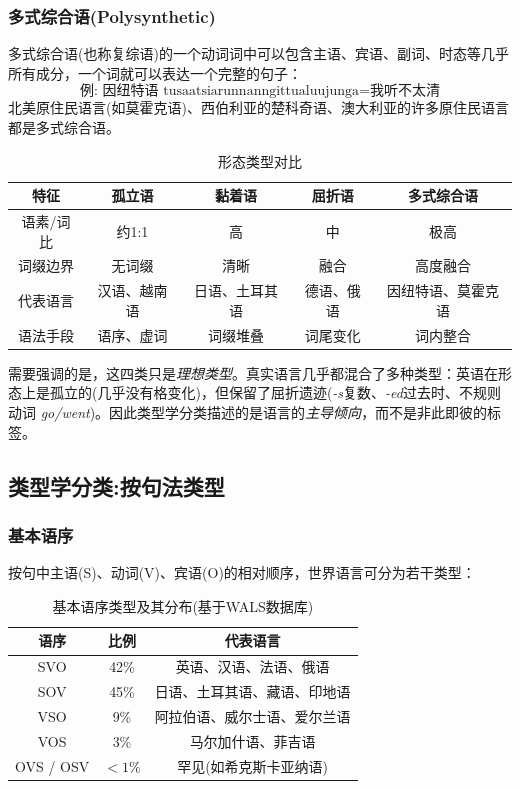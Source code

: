 \subsubsection{多式综合语(Polysynthetic)}

多式综合语(也称复综语)的一个动词词中可以包含主语、宾语、副词、时态等几乎所有成分，一个词就可以表达一个完整的句子：
\begin{equation}
    \text{例: 因纽特语 tusaatsiarunnanngittualuujunga} = \text{我听不太清}
\end{equation}
北美原住民语言(如莫霍克语)、西伯利亚的楚科奇语、澳大利亚的许多原住民语言都是多式综合语。

\begin{table}[H]
\centering
\caption{形态类型对比}
\begin{tabulary}{\textwidth}{@{}CCCCC@{}}
\toprule
\textbf{特征} & \textbf{孤立语} & \textbf{黏着语} & \textbf{屈折语} & \textbf{多式综合语} \\
\midrule
语素/词比 & 约1:1 & 高 & 中 & 极高 \\
词缀边界 & 无词缀 & 清晰 & 融合 & 高度融合 \\
代表语言 & 汉语、越南语 & 日语、土耳其语 & 德语、俄语 & 因纽特语、莫霍克语 \\
语法手段 & 语序、虚词 & 词缀堆叠 & 词尾变化 & 词内整合 \\
\bottomrule
\end{tabulary}
\end{table}

需要强调的是，这四类只是\emph{理想类型}。真实语言几乎都混合了多种类型：英语在形态上是孤立的(几乎没有格变化)，但保留了屈折遗迹(\emph{-s}复数、\emph{-ed}过去时、不规则动词 \emph{go/went})。因此类型学分类描述的是语言的\emph{主导倾向}，而不是非此即彼的标签。

\subsection{类型学分类:按句法类型}

\subsubsection{基本语序}

按句中主语(S)、动词(V)、宾语(O)的相对顺序，世界语言可分为若干类型：

\begin{table}[H]
\centering
\caption{基本语序类型及其分布(基于WALS数据库)}
\begin{tabulary}{\textwidth}{@{}CCC@{}}
\toprule
\textbf{语序} & \textbf{比例} & \textbf{代表语言} \\
\midrule
SVO & 42\% & 英语、汉语、法语、俄语 \\
SOV & 45\% & 日语、土耳其语、藏语、印地语 \\
VSO & 9\% & 阿拉伯语、威尔士语、爱尔兰语 \\
VOS & 3\% & 马尔加什语、菲吉语 \\
OVS / OSV & $<1\%$ & 罕见(如希克斯卡亚纳语) \\
\bottomrule
\end{tabulary}
\end{table}

